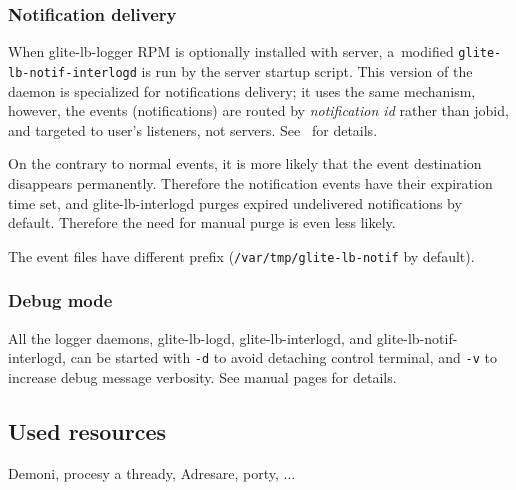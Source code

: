 

\subsubsection{Notification delivery}
\begin{sloppypar}
When glite-lb-logger RPM is optionally installed with \LB server, 
a~modified \verb'glite-lb-notif-interlogd' is run by the server startup
script.
This version of the daemon is specialized for \LB notifications delivery;
it uses the same mechanism, however, the events (notifications) are routed
by \emph{notification id} rather than jobid, and targeted to user's listeners,
not \LB servers.
See~\cite{lbug, lbdg} for details.
\end{sloppypar}

On the contrary to normal events, it is more likely that the event destination
disappears permanently.
Therefore the notification events have their expiration time set,
and glite-lb-interlogd purges expired undelivered notifications by default.
Therefore the need for manual purge is even less likely.

The event files have different prefix (\verb'/var/tmp/glite-lb-notif' by default).

\subsubsection{Debug mode}

All the logger daemons, \ie glite-lb-logd, glite-lb-interlogd, and
glite-lb-notif-interlogd, can be started with \verb'-d' 
to avoid detaching control terminal, and \verb'-v' to increase 
debug message verbosity.
See manual pages for details.

\subsection{Used resources}

Demoni, procesy a thready, Adresare, porty, ...
